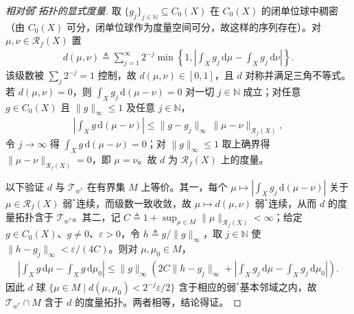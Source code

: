 \documentclass[../../main.tex]{subfiles}%
\begin{document}
\begin{proof}[相对弱$^*$拓扑的显式度量]
取 $\{g_j\}_{j\in\mathbb{N}}\subseteq C_0(X)$ 在 $C_0(X)$ 的闭单位球中稠密（由 $C_0(X)$ 可分，闭单位球作为度量空间可分，故这样的序列存在）。对 $\mu,\nu\in\mathscr{R}_f(X)$ 置
\begin{align*}
d(\mu,\nu)\triangleq\sum_{j=1}^{\infty}2^{-j}\min\left\{1,\left|\int_X g_j\,\mathrm{d}\mu-\int_X g_j\,\mathrm{d}\nu\right|\right\}.
\end{align*}
该级数被 $\sum_{j}2^{-j}=1$ 控制，故 $d(\mu,\nu)\in[0,1]$，且 $d$ 对称并满足三角不等式。若 $d(\mu,\nu)=0$，则 $\int_X g_j\,\mathrm{d}(\mu-\nu)=0$ 对一切 $j\in\mathbb{N}$ 成立；对任意 $g\in C_0(X)$ 且 $\|g\|_\infty\leqslant1$ 及任意 $j\in\mathbb{N}$，
\begin{align*}
\left|\int_X g\,\mathrm{d}(\mu-\nu)\right|
\leqslant\|g-g_j\|_\infty\,\|\mu-\nu\|_{\mathscr{R}_f(X)},
\end{align*}
令 $j\to\infty$ 得 $\int_X g\,\mathrm{d}(\mu-\nu)=0$；对 $\|g\|_\infty\leqslant1$ 取上确界得 $\|\mu-\nu\|_{\mathscr{R}_f(X)}=0$，即 $\mu=\nu$。故 $d$ 为 $\mathscr{R}_f(X)$ 上的度量。

以下验证 $d$ 与 $\mathcal{T}_{w^*}$ 在有界集 $M$ 上等价。其一，每个 $\mu\mapsto\left|\int_X g_j\,\mathrm{d}(\mu-\nu)\right|$ 关于 $\mu\in\mathscr{R}_f(X)$ 弱$^*$连续，而级数一致收敛，故 $\mu\mapsto d(\mu,\nu)$ 弱$^*$连续，从而 $d$ 的度量拓扑含于 $\mathcal{T}_{w^*}$。其二，记 $C\triangleq1+\sup_{\mu\in M}\|\mu\|_{\mathscr{R}_f(X)}<\infty$；给定 $g\in C_0(X)$、$g\neq0$、$\varepsilon>0$，令 $h\triangleq g/\|g\|_\infty$，取 $j\in\mathbb{N}$ 使 $\|h-g_j\|_\infty<\varepsilon/(4C)$。则对 $\mu,\mu_0\in M$，
\begin{align*}
\left|\int_X g\,\mathrm{d}\mu-\int_X g\,\mathrm{d}\mu_0\right|
\leqslant\|g\|_\infty\left(2C\|h-g_j\|_\infty+
\left|\int_X g_j\,\mathrm{d}\mu-\int_X g_j\,\mathrm{d}\mu_0\right|\right).
\end{align*}
因此 $d$ 球 $\{\mu\in M\mid d(\mu,\mu_0)<2^{-j}\varepsilon/2\}$ 含于相应的弱$^*$基本邻域之内，故 $\mathcal{T}_{w^*}\cap M$ 含于 $d$ 的度量拓扑。两者相等，结论得证。
\end{proof}
\end{document}
